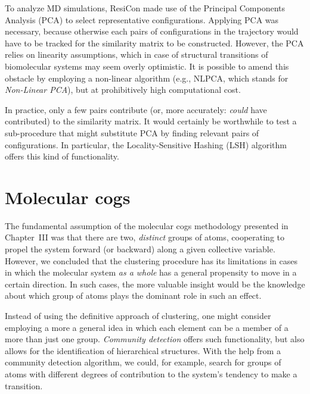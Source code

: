 \documentclass[a4paper,11pt,twoside]{book}%
\begin{document}
To analyze MD simulations, ResiCon made use of the Principal Components Analysis (PCA) to select representative configurations. %
Applying PCA was necessary, because otherwise each pairs of configurations in the trajectory would have to be tracked for the similarity matrix to be constructed.
However, the PCA relies on linearity assumptions, which in case of structural transitions of biomolecular systems may seem overly optimistic.
It is possible to amend this obstacle by employing a non-linear algorithm (e.g., NLPCA, which stands for \emph{Non-Linear PCA}), but at prohibitively high computational cost.

In practice, only a few pairs contribute (or, more accurately: \emph{could} have contributed) to the similarity matrix.
It would certainly be worthwhile to test a sub-procedure that might substitute PCA by finding relevant pairs of configurations.
In particular, the Locality-Sensitive Hashing (LSH) algorithm offers this kind of functionality.

\section{Molecular cogs}

The fundamental assumption of the molecular cogs methodology presented in Chapter~III was that there are two, \emph{distinct} groups of atoms, cooperating to propel the system forward (or backward) along a given collective variable.
However, we concluded that the clustering procedure has its limitations in cases in which the molecular system \emph{as a whole} has a general propensity to move in a certain direction.
In such cases, the more valuable insight would be the knowledge about which group of atoms plays the dominant role in such an effect.

Instead of using the definitive approach of clustering, one might consider employing a more a general idea in which each element can be a member of a more than just one group.
\emph{Community detection} offers such functionality, but also allows for the identification of hierarchical structures.
With the help from a community detection algorithm, we could, for example, search for groups of atoms with different degrees of contribution to the system's tendency to make a transition.
\end{document}
